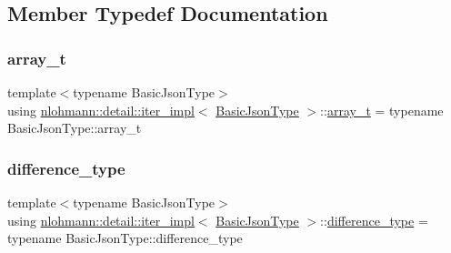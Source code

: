 \subsection{Member Typedef Documentation}
\mbox{\label{classnlohmann_1_1detail_1_1iter__impl_aef02cf75b1cb199286fd2f666c60e38e}} 
\subsubsection{\texorpdfstring{array\+\_\+t}{array\_t}}
{\footnotesize\ttfamily template$<$typename Basic\+Json\+Type$>$ \\
using \hyperlink{classnlohmann_1_1detail_1_1iter__impl}{nlohmann\+::detail\+::iter\+\_\+impl}$<$ \hyperlink{classnlohmann_1_1detail_1_1iter__impl_abf18f18793f84b0222aebb5a2a87da7a}{Basic\+Json\+Type} $>$\+::\hyperlink{classnlohmann_1_1detail_1_1iter__impl_aef02cf75b1cb199286fd2f666c60e38e}{array\+\_\+t} =  typename Basic\+Json\+Type\+::array\+\_\+t\hspace{0.3cm}{\ttfamily [private]}}

\mbox{\label{classnlohmann_1_1detail_1_1iter__impl_a2f7ea9f7022850809c60fc3263775840}} 
\subsubsection{\texorpdfstring{difference\+\_\+type}{difference\_type}}
{\footnotesize\ttfamily template$<$typename Basic\+Json\+Type$>$ \\
using \hyperlink{classnlohmann_1_1detail_1_1iter__impl}{nlohmann\+::detail\+::iter\+\_\+impl}$<$ \hyperlink{classnlohmann_1_1detail_1_1iter__impl_abf18f18793f84b0222aebb5a2a87da7a}{Basic\+Json\+Type} $>$\+::\hyperlink{classnlohmann_1_1detail_1_1iter__impl_a2f7ea9f7022850809c60fc3263775840}{difference\+\_\+type} =  typename Basic\+Json\+Type\+::difference\+\_\+type}



